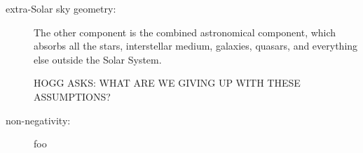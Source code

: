 \documentclass{article}
\begin{document}
\begin{description}
    \item[extra-Solar sky geometry:]
    The other component is the combined astronomical component, which absorbs all the stars, interstellar medium, galaxies, quasars, and everything else outside the Solar System.
    

    HOGG ASKS: WHAT ARE WE GIVING UP WITH THESE ASSUMPTIONS?

    \item[non-negativity:] foo
\end{description}
\end{document}
